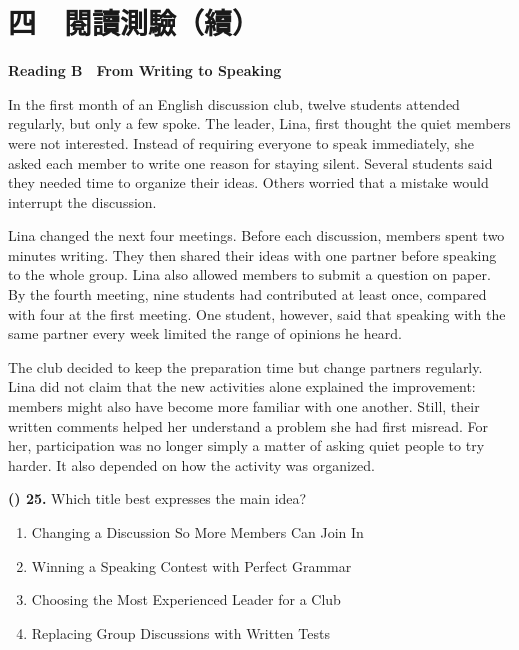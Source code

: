 \documentclass[11pt,a4paper]{article}
\newenvironment{qblock}{\par\vspace{3pt}\noindent\begin{minipage}{\linewidth}}{\end{minipage}\par\vspace{4pt}}
\begin{document}
\section*{四　閱讀測驗（續）}
\textbf{Reading B　From Writing to Speaking}\par\smallskip
In the first month of an English discussion club, twelve students attended regularly, but only a few spoke. The leader, Lina, first thought the quiet members were not interested. Instead of requiring everyone to speak immediately, she asked each member to write one reason for staying silent. Several students said they needed time to organize their ideas. Others worried that a mistake would interrupt the discussion.
\par\smallskip
Lina changed the next four meetings. Before each discussion, members spent two minutes writing. They then shared their ideas with one partner before speaking to the whole group. Lina also allowed members to submit a question on paper. By the fourth meeting, nine students had contributed at least once, compared with four at the first meeting. One student, however, said that speaking with the same partner every week limited the range of opinions he heard.
\par\smallskip
The club decided to keep the preparation time but change partners regularly. Lina did not claim that the new activities alone explained the improvement: members might also have become more familiar with one another. Still, their written comments helped her understand a problem she had first misread. For her, participation was no longer simply a matter of asking quiet people to try harder. It also depended on how the activity was organized.
\par\smallskip
\begin{qblock}
\textbf{(\hspace{0.6cm}) 25.} Which title best expresses the main idea?
\par
\begin{enumerate}[label=(\Alph*),leftmargin=1.0cm,nosep,topsep=2pt]
\item Changing a Discussion So More Members Can Join In
\item Winning a Speaking Contest with Perfect Grammar
\item Choosing the Most Experienced Leader for a Club
\item Replacing Group Discussions with Written Tests
\end{enumerate}
\end{qblock}
\end{document}
